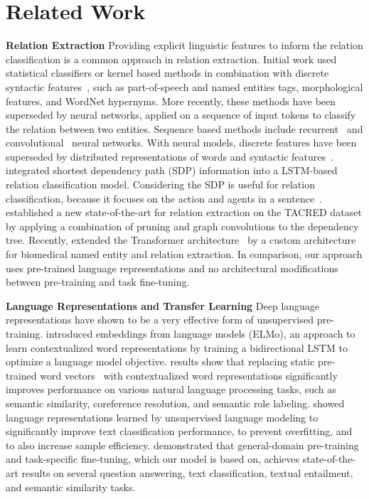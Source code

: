 \documentclass[akbc,twoside,11pt]{article}
\begin{document}
\section{Related Work}
\label{related_work}
\noindent  \textbf{Relation Extraction} \quad Providing explicit linguistic features to inform the relation classification is a common approach in relation extraction. Initial work used statistical classifiers or kernel based methods in combination with discrete syntactic features~\cite{zelenko_kernel_2003, mintz_distantsf_2009, hendrickx_semeval2010t8_2010}, such as part-of-speech and named entities tags, morphological features, and WordNet hypernyms. More recently, these methods have been superseded by neural networks, applied on a sequence of input tokens to classify the relation between two entities. Sequence based methods include recurrent~\cite{socher_semanticct_2012, zhang_relationcv_2015} and convolutional~\cite{zeng_relationcv_2014, zeng_distant_2015} neural networks. With neural models, discrete features have been superseded by distributed representations of words and syntactic features~\cite{turian_wordra_2010, pennington_glove_2014}. \citet{xu_semanticrc_2015, xu_classifyingrv_2015} integrated shortest dependency path (SDP) information into a LSTM-based relation classification model. Considering the SDP is useful for relation classification, because it focuses on the action and agents in a sentence~\cite{bunescu_shortest_2005,socher_groundedcs_2014}. \citet{zhang_graphco_2018} established a new state-of-the-art for relation extraction on the TACRED dataset by applying a combination of pruning and graph convolutions to the dependency tree.
Recently, \citet{verga_transformer_2018} extended the Transformer architecture~\cite{vaswani_attention_2017} by a custom architecture  for biomedical named entity and relation extraction. In comparison, our approach uses pre-trained language representations and no architectural modifications between pre-training and task fine-tuning.

\noindent \textbf{Language Representations and Transfer Learning} \quad
Deep language representations have shown to be a very effective form of unsupervised pre-training. \cite{peters_deepcw_2018} introduced embeddings from language models (ELMo), an approach to learn contextualized word representations by training a bidirectional LSTM to optimize a language model objective. \citet{peters_deepcw_2018} results show that replacing static pre-trained word vectors~\cite{mikolov_efficienteo_2013,pennington_glove_2014} with contextualized word representations significantly improves performance on various natural language processing tasks, such as  semantic similarity, coreference resolution, and semantic role labeling. \citet{ruder_universallm_2018} showed language representations learned by unsupervised language modeling to significantly improve text classification performance, to prevent overfitting, and to also increase sample efficiency. \cite{radford_improvinglu_2018} demonstrated that general-domain pre-training and task-specific fine-tuning, which our model is based on, achieves state-of-the-art results on several question answering, text classification, textual entailment, and semantic similarity tasks.
\end{document}
